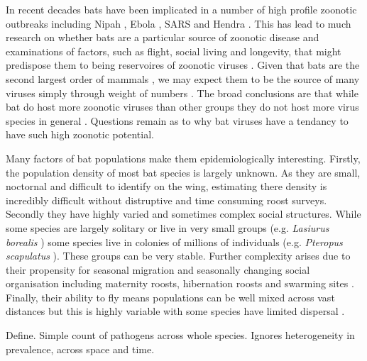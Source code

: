 In recent decades bats have been implicated in a number of high profile zoonotic outbreaks including Nipah \cite{field2001natural}, Ebola \cite{leroy2005fruit}, SARS \cite{li2005bats} and Hendra \cite{field2001natural}.
This has lead to much research on whether bats are a particular source of zoonotic disease \cite{luis2013comparison, olival2015bats, wang2011mass} and examinations of factors, such as flight, social living and longevity, that might predispose them to being reservoires of zoonotic viruses \cite{calisher2006bats, o2014bat, dobson2005links}.
Given that bats are the second largest order of mammals \cite{wilson2005mammal}, we may expect them to be the source of many viruses simply through weight of numbers \cite{luis2013comparison}.
The broad conclusions are that while bat do host more zoonotic viruses than other groups \cite{luis2013comparison} they do not host more virus species in general \cite{olival2015bats}.
Questions remain as to why bat viruses have a tendancy to have such high zoonotic potential.

Many factors of bat populations make them epidemiologically interesting.
Firstly, the population density of most bat species is largely unknown.
As they are small, noctornal and difficult to identify on the wing, estimating there density is incredibly difficult without distruptive and time consuming roost surveys.
Secondly they have highly varied and sometimes complex social structures.
While some species are largely solitary or live in very small groups (e.g. \emph{Lasiurus borealis} \cite{shump1982lasiurus}) some species live in colonies of millions of individuals (e.g. \emph{Pteropus scapulatus} \cite{birt2008little}).
These groups can be very stable.
Further complexity arises due to their propensity for seasonal migration \cite{} and seasonally changing social organisation including maternity roosts, hibernation roosts and swarming sites \cite{}.
Finally, their ability to fly means populations can be well mixed across vast distances \cite{peel2013continent} but this is highly variable with some species have limited dispersal \cite{}.







Define.
Simple count of pathogens across whole species.
Ignores heterogeneity in prevalence, across space and time.








